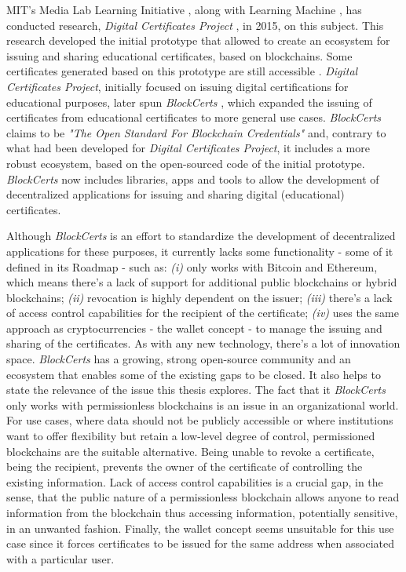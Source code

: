 MIT's Media Lab Learning Initiative \cite{mit_learning_initiative}, along with Learning Machine \cite{learning_machine}, has conducted research, \textit{Digital Certificates Project} \cite{MITCertificates}, in 2015, on this subject. This research developed the initial prototype that allowed to create an ecosystem for issuing and sharing educational certificates, based on blockchains. Some certificates generated based on this prototype are still accessible \cite{MITCertificatesBootcamp}. \textit{Digital Certificates Project}, initially focused on issuing digital certifications for educational purposes, later spun \textit{BlockCerts} \cite{Blockcerts}, which expanded the issuing of certificates from educational certificates to more general use cases. \textit{BlockCerts} claims to be \textit{"The Open Standard For Blockchain Credentials"} and, contrary to what had been developed for \textit{Digital Certificates Project}, it includes a more robust ecosystem, based on the open-sourced code of the initial prototype. \textit{BlockCerts} now includes libraries, apps and tools to allow the development of decentralized  applications for issuing and sharing digital (educational) certificates.

Although \textit{BlockCerts} is an effort to standardize the development of decentralized applications for these purposes, it currently lacks some functionality - some of it defined in its Roadmap - such as: \emph{(i)} only works with Bitcoin and Ethereum, which means there's a lack of support for additional public blockchains or hybrid blockchains; \emph{(ii)} revocation is highly dependent on the issuer; \emph{(iii)} there's a lack of access control capabilities for the recipient of the certificate; \emph{(iv)} uses the same approach as cryptocurrencies - the wallet concept - to manage the issuing and sharing of the certificates. As with any new technology, there's a lot of innovation space. \textit{BlockCerts} has a growing, strong open-source community and an ecosystem that enables some of the existing gaps to be closed. It also helps to state the relevance of the issue this thesis explores. The fact that it \emph{BlockCerts} only works with permissionless blockchains is an issue in an organizational world. For use cases, where data should not be publicly accessible or where institutions want to offer flexibility but retain a low-level degree of control, permissioned blockchains are the suitable alternative. Being unable to revoke a certificate, being the recipient, prevents the owner of the certificate of controlling the existing information. Lack of access control capabilities is a crucial gap, in the sense, that the public nature of a permissionless blockchain allows anyone to read information from the blockchain thus accessing information, potentially sensitive, in an unwanted fashion. Finally, the wallet concept seems unsuitable for this use case since it forces certificates to be issued for the same address when associated with a particular user.

